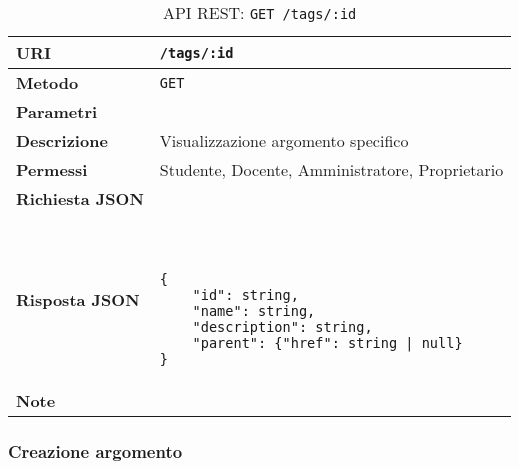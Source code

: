        \begin{table}[H]
            \begin{center}
                \begin{tabular}{p{} p{}}
                    \toprule
                    \textbf{URI} & \texttt{/tags/:id} \\ \midrule
                    \textbf{Metodo} & \texttt{GET} \\ \midrule
                    \textbf{Parametri} & \\ \midrule
                    \textbf{Descrizione} & Visualizzazione argomento specifico \\ \midrule
                    \textbf{Permessi} & Studente, Docente, Amministratore, Proprietario  \\ \midrule
                    \textbf{Richiesta JSON} & \\ \midrule
                    \textbf{Risposta JSON} & \
                        \begin{lstlisting}[basicstyle={\ttfamily}]
{
    "id": string,
    "name": string,
    "description": string,
    "parent": {"href": string | null}
}
                        \end{lstlisting}
                        \\ \midrule
                    \textbf{Note} & \\
                    \bottomrule
                \end{tabular}
                \caption{API REST: \texttt{GET /tags/:id}}
            \end{center}
        \end{table}

    \subsubsection{Creazione argomento}
    
